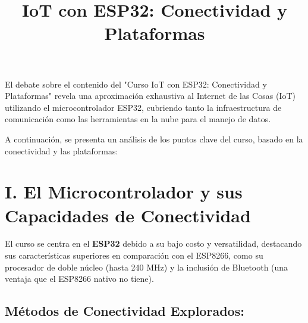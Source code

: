 \documentclass{article}
\title{IoT con ESP32: Conectividad y Plataformas}
\author{}
\date{}
\begin{document}
\maketitle

El debate sobre el contenido del "Curso IoT con ESP32: Conectividad y Plataformas" revela una aproximación exhaustiva al Internet de las Cosas (IoT) utilizando el microcontrolador ESP32, cubriendo tanto la infraestructura de comunicación como las herramientas en la nube para el manejo de datos.

A continuación, se presenta un análisis de los puntos clave del curso, basado en la conectividad y las plataformas:

\section*{I. El Microcontrolador y sus Capacidades de Conectividad}

El curso se centra en el \textbf{ESP32} debido a su bajo costo y versatilidad, destacando sus características superiores en comparación con el ESP8266, como su procesador de doble núcleo (hasta 240 MHz) y la inclusión de Bluetooth (una ventaja que el ESP8266 nativo no tiene).

\subsection*{Métodos de Conectividad Explorados:}
\end{document}
